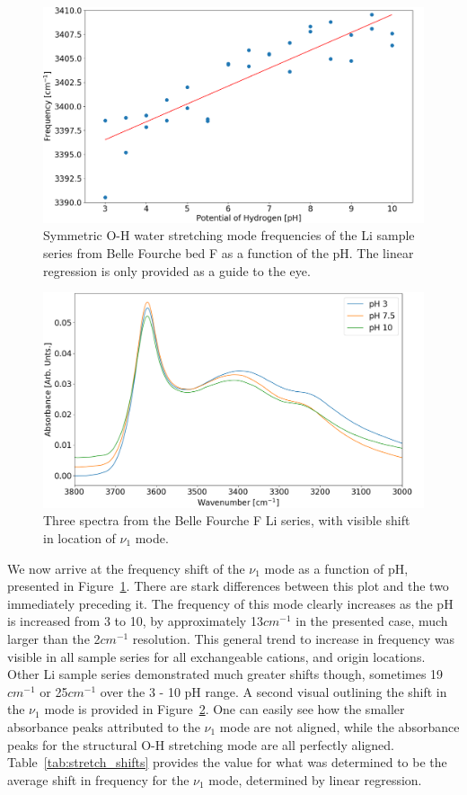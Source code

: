 \begin{figure}
	\centering
	\includegraphics[scale=0.5]{images/water_shift.png}
	\caption{Symmetric O-H water stretching mode frequencies of the Li sample series from Belle Fourche bed F as a function of the pH. The linear regression is only provided as a guide to the eye.}
	\label{fig:water_shift}
\end{figure}
\begin{figure}
	\centering
	\includegraphics[scale=0.5]{images/spectra_shifts.png}
	\caption{Three spectra from the Belle Fourche F Li series, with visible shift in location of $\nu_1$ mode.}
	\label{fig:spectra_shift}
\end{figure}

We now arrive at the frequency shift of the $\nu_1$ mode as a function of pH, presented in Figure~\ref{fig:water_shift}. There are stark differences between this plot and the two immediately preceding it. The frequency of this mode clearly increases as the pH is increased from 3 to 10, by approximately 13$cm^{-1}$ in the presented case, much larger than the 2$cm^{-1}$ resolution. This general trend to increase in frequency was visible in all sample series for all exchangeable cations, and origin locations. Other Li sample series demonstrated much greater shifts though, sometimes 19$cm^{-1}$ or 25$cm^{-1}$ over the 3 - 10 pH range. A second visual outlining the shift in the $\nu_1$ mode is provided in Figure~\ref{fig:spectra_shift}. One can easily see how the smaller absorbance peaks attributed to the $\nu_1$ mode are not aligned, while the absorbance peaks for the structural O-H stretching mode are all perfectly aligned. Table~\ref{tab:stretch_shifts} provides the value for what was determined to be the average shift in frequency for the $\nu_1$ mode, determined by linear regression.

